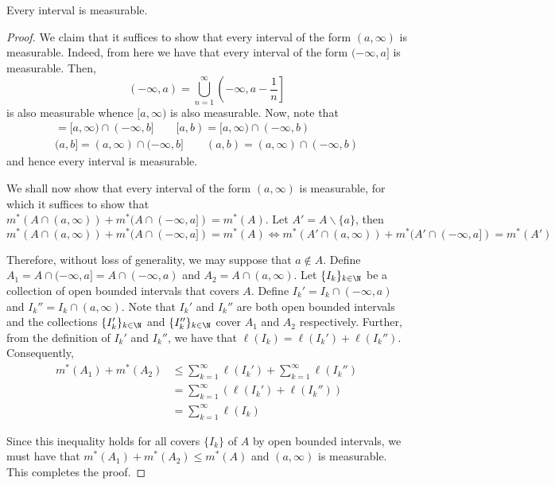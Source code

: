 \begin{proposition}
    Every interval is measurable.
\end{proposition}
\begin{proof}
    We claim that it suffices to show that every interval of the form $(a,\infty)$ is measurable. Indeed, from here we have that every interval of the form $(-\infty, a]$ is measurable. Then, 
    \begin{equation*}
        (-\infty, a) = \bigcup_{n = 1}^\infty \left(-\infty, a - \frac{1}{n}\right]
    \end{equation*}
    is also measurable whence $[a,\infty)$ is also measurable. Now, note that 
    \begin{align*}
        [a,b] = [a,\infty)\cap(-\infty, b]\qquad [a,b) = [a,\infty)\cap(-\infty, b)\\
        (a,b] = (a,\infty)\cap(-\infty,b]\qquad (a,b) = (a,\infty)\cap(-\infty, b)
    \end{align*}
    and hence every interval is measurable.


    We shall now show that every interval of the form $(a,\infty)$ is measurable, for which it suffices to show that $m^*(A\cap(a,\infty)) + m^*(A\cap(-\infty,a]) = m^*(A)$. Let $A' = A\backslash\{a\}$, then 
    \begin{equation*}
        m^*(A\cap(a,\infty)) + m^*(A\cap(-\infty,a]) = m^*(A)\Longleftrightarrow m^*(A'\cap(a,\infty)) + m^*(A'\cap(-\infty,a]) = m^*(A')
    \end{equation*}

    Therefore, without loss of generality, we may suppose that $a\notin A$. Define $A_1 = A\cap(-\infty, a] = A\cap(-\infty, a)$ and $A_2 = A\cap(a,\infty)$. Let $\{I_k\}_{k\in\N}$ be a collection of open bounded intervals that covers $A$. Define $I_k' = I_k\cap(-\infty, a)$ and $I_k'' = I_k\cap(a,\infty)$. Note that $I_k'$ and $I_k''$ are both open bounded intervals and the collections $\{I_k'\}_{k\in\N}$ and $\{I_k''\}_{k\in\N}$ cover $A_1$ and $A_2$ respectively. Further, from the definition of $I_k'$ and $I_k''$, we have that $\ell(I_k) = \ell(I_k') + \ell(I_k'')$. Consequently, 
    \begin{align*}
        m^*(A_1) + m^*(A_2) &\le \sum_{k = 1}^\infty\ell(I_k') + \sum_{k = 1}^\infty\ell(I_k'')\\
        &= \sum_{k = 1}^\infty\left(\ell(I_k') + \ell(I_k'')\right)\\
        &= \sum_{k = 1}^\infty\ell(I_k)
    \end{align*}

    Since this inequality holds for all covers $\{I_k\}$ of $A$ by open bounded intervals, we must have that $m^*(A_1) + m^*(A_2)\le m^*(A)$ and $(a,\infty)$ is measurable. This completes the proof.
\end{proof}

